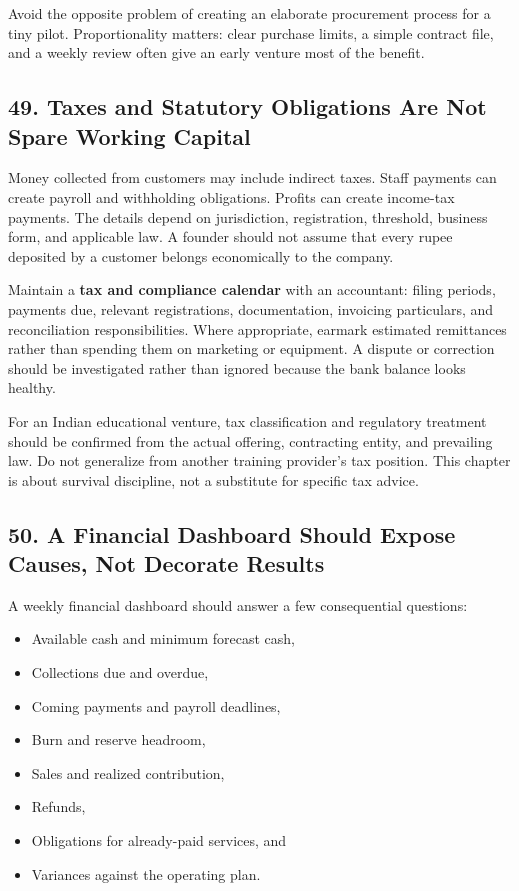 Avoid the opposite problem of creating an elaborate procurement process for a tiny pilot. Proportionality matters: clear purchase limits, a simple contract file, and a weekly review often give an early venture most of the benefit.

\subsection*{49. Taxes and Statutory Obligations Are Not Spare Working Capital}

Money collected from customers may include indirect taxes. Staff payments can create payroll and withholding obligations. Profits can create income-tax payments. The details depend on jurisdiction, registration, threshold, business form, and applicable law. A founder should not assume that every rupee deposited by a customer belongs economically to the company.

Maintain a \textbf{tax and compliance calendar} with an accountant: filing periods, payments due, relevant registrations, documentation, invoicing particulars, and reconciliation responsibilities. Where appropriate, earmark estimated remittances rather than spending them on marketing or equipment. A dispute or correction should be investigated rather than ignored because the bank balance looks healthy.

For an Indian educational venture, tax classification and regulatory treatment should be confirmed from the actual offering, contracting entity, and prevailing law. Do not generalize from another training provider's tax position. This chapter is about survival discipline, not a substitute for specific tax advice.

\subsection*{50. A Financial Dashboard Should Expose Causes, Not Decorate Results}

A weekly financial dashboard should answer a few consequential questions:
\begin{itemize}
\item Available cash and minimum forecast cash,
\item Collections due and overdue,
\item Coming payments and payroll deadlines,
\item Burn and reserve headroom,
\item Sales and realized contribution,
\item Refunds,
\item Obligations for already-paid services, and
\item Variances against the operating plan.
\end{itemize}

